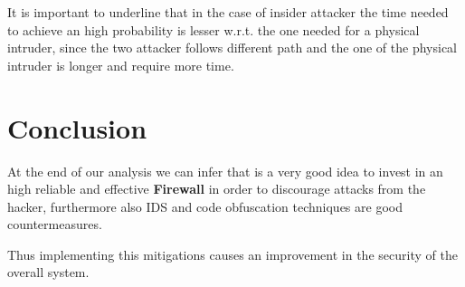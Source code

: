 \noindent It is important to underline that in the case of insider attacker the time needed to achieve an high probability is lesser w.r.t. the one needed for a physical intruder, since the two attacker follows different path and the one of the physical intruder is longer and require more time.

\section{Conclusion}
\noindent At the end of our analysis we can infer that is a very good idea to invest in an high reliable and effective \textbf{Firewall} in order to discourage attacks from the hacker, furthermore also IDS and code obfuscation techniques are good countermeasures.

\noindent Thus implementing this mitigations causes an improvement in the security of the overall system.
